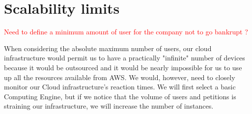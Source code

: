 \section{Scalability limits}

\textcolor{red}{Need to define a minimum amount of user for the company not to go bankrupt ?}

When considering the absolute maximum number of users, our cloud infrastructure would permit us to have a practically "infinite" number of devices because it would be outsourced and it would be nearly impossible for us to use up all the resources available from AWS. We would, however, need to closely monitor our Cloud infrastructure's reaction times. We will first select a basic Computing Engine, but if we notice that the volume of users and petitions is straining our infrastructure, we will increase the number of instances.

